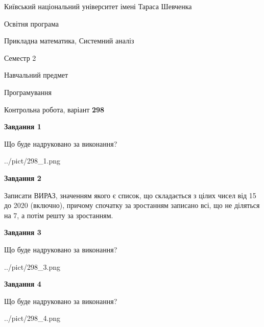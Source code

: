 \documentclass[12pt, ukrainian]{article}
\begin{document}
{{\begin {small}\par
{ \center  Київський національний університет імені Тараса Шевченка \par}
{\parbox {5 cm}{Освітня програма \hfill}{\parbox {8 cm}{Прикладна математика, Системний аналіз \hfill}}\parbox {5 cm}{\hfill Семестр 2}}\par
{\parbox {5 cm} {Навчальний предмет \hfill}\parbox {7 cm}{Програмування \hfill}\parbox {6cm}{\hfill}\par}\vspace{-7pt} \end{small}}{\center Контрольна робота, варіант  \No \textbf
{ 298 }\par}}
{
\begin {large}
{\begin {center}\textbf{Завдання 1}\end {center}}\par
Що буде надруковано за виконання?\par\par
\begin{center}
	{../pict/298_1.png}
\end{center}
\newpage

{\begin {center}\textbf{Завдання 2}\end {center}}\par

Записати ВИРАЗ, значенням якого є список, що складається з цілих чисел від 15 до 2020 (включно), причому спочатку за зростанням записано всі, що не діляться на 7, а потім решту за зростанням.\par
\newpage

{\begin {center}\textbf{Завдання 3}\end {center}}\par
Що буде надруковано за виконання?\par
\begin{center}
	{../pict/298_3.png}
\end{center}
\newpage

{\begin {center}\textbf{Завдання 4}\end {center}}\par
Що буде надруковано за виконання?\par
\begin{center}
	{../pict/298_4.png}
\end{center}
\newpage


\end{large}}
\end{document}
